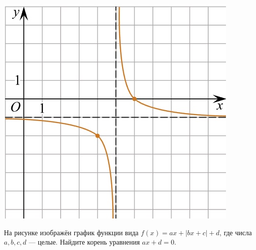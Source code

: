 \begin{class}[number=5]
\begin{listofex}
\begin{minipage}[c]{0.25\textwidth}
			\includegraphics[align=t, width=\textwidth]{pics/G101M4C5-5.jpg}
		\end{minipage}
		\item
		\begin{minipage}[t]{0.43\textwidth}
			На рисунке изображён график функции вида \(f(x)=ax+|bx+c|+d\), где числа \(a, b, c, d\) --- целые. Найдите корень уравнения \(ax+d=0\).
		\end{minipage}
		\begin{minipage}[c]{0.17\textwidth}

\end{minipage}
\end{listofex}
\end{class}

